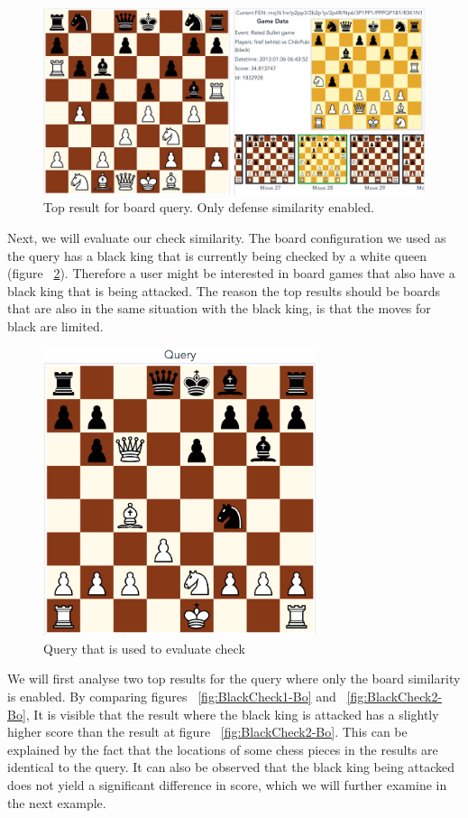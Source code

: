 \documentclass[11pt]{article}
\begin{document}
    \begin{figure}[H]
        \centering
        \includegraphics[width=14cm]{images/Defense}
        \caption{Top result for board query. Only defense similarity enabled.}
        \label{fig:Defense}
    \end{figure}

    Next, we will evaluate our check similarity. The board configuration we used as the query has a black king that is currently being checked by a white queen (figure ~\ref{fig:BlackCheckQuery}). Therefore a user might be interested in board games that also have a black king that is being attacked. The reason the top results should be boards that are also in the same situation with the black king, is that the moves for black are limited.

    \begin{figure}[H]
        \centering
        \includegraphics[width=8cm]{images/QueryBlackCheck}
        \caption{Query that is used to evaluate check}
        \label{fig:BlackCheckQuery}
    \end{figure}

    We will first analyse two top results for the query where only the board similarity is enabled. By comparing figures ~\ref{fig:BlackCheck1-Bo} and ~\ref{fig:BlackCheck2-Bo}, It is visible that the result where the black king is attacked has a slightly higher score than the result at figure ~\ref{fig:BlackCheck2-Bo}. This can be explained by the fact that the locations of some chess pieces in the results are identical to the query. It can also be observed that the black king being attacked does not yield a significant difference in score, which we will further examine in the next example.
\end{document}
